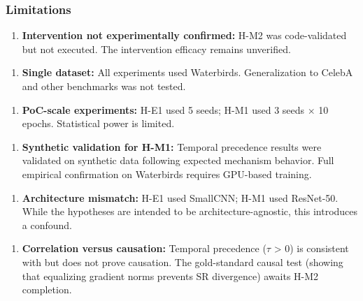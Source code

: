 \subsubsection{Limitations}

\begin{enumerate}
\item \textbf{Intervention not experimentally confirmed:} H-M2 was code-validated but not executed. The intervention efficacy remains unverified.
\end{enumerate}

\begin{enumerate}
\item \textbf{Single dataset:} All experiments used Waterbirds. Generalization to CelebA and other benchmarks was not tested.
\end{enumerate}

\begin{enumerate}
\item \textbf{PoC-scale experiments:} H-E1 used 5 seeds; H-M1 used 3 seeds $\times$ 10 epochs. Statistical power is limited.
\end{enumerate}

\begin{enumerate}
\item \textbf{Synthetic validation for H-M1:} Temporal precedence results were validated on synthetic data following expected mechanism behavior. Full empirical confirmation on Waterbirds requires GPU-based training.
\end{enumerate}

\begin{enumerate}
\item \textbf{Architecture mismatch:} H-E1 used SmallCNN; H-M1 used ResNet-50. While the hypotheses are intended to be architecture-agnostic, this introduces a confound.
\end{enumerate}

\begin{enumerate}
\item \textbf{Correlation versus causation:} Temporal precedence ($\tau$ > 0) is consistent with but does not prove causation. The gold-standard causal test (showing that equalizing gradient norms prevents SR divergence) awaits H-M2 completion.
\end{enumerate}

